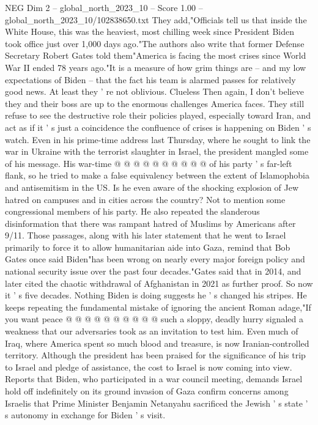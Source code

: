 \begin{textsample}{NEG Dim 2 – global\_north\_2023\_10 – Score 1.00 – global\_north\_2023\_10/102838650.txt}  \label{ex:f2_neg_295}
They add,"Officials tell us that inside the White House, this was the heaviest, most chilling week since President Biden took office just over 1,000 days ago."The authors also write that former Defense Secretary Robert Gates told them"America is facing the most crises since World War II ended 78 years ago."It is a measure of how grim things are -- and my low expectations of Biden -- that the fact his team is alarmed passes for relatively good news.
At least they ' re not oblivious.
Clueless Then again, I don't believe they and their boss are up to the enormous challenges America faces.
They still refuse to see the destructive role their policies played, especially toward Iran, and act as if it ' s just a coincidence the confluence of crises is happening on Biden ' s watch.
Even in his prime-time address last Thursday, where he sought to link the war in Ukraine with the terrorist slaughter in Israel, the president mangled some of his message.
His war-time @ @ @ @ @ @ @ @ @ @ of his party ' s far-left flank, so he tried to make a false equivalency between the extent of Islamophobia and antisemitism in the US.
Is he even aware of the shocking explosion of Jew hatred on campuses and in cities across the country?
Not to mention some congressional members of his party.
He also repeated the slanderous disinformation that there was rampant hatred of Muslims by Americans after 9/11.
Those passages, along with his later statement that he went to Israel primarily to force it to allow humanitarian aide into Gaza, remind that Bob Gates once said Biden"has been wrong on nearly every major foreign policy and national security issue over the past four decades."Gates said that in 2014, and later cited the chaotic withdrawal of Afghanistan in 2021 as further proof.
So now it ' s five decades.
Nothing Biden is doing suggests he ' s changed his stripes.
He keeps repeating the fundamental mistake of ignoring the ancient Roman adage,"If you want peace @ @ @ @ @ @ @ @ @ @ such a sloppy, deadly hurry signaled a weakness that our adversaries took as an invitation to test him.
Even much of Iraq, where America spent so much blood and treasure, is now Iranian-controlled territory.
Although the president has been praised for the significance of his trip to Israel and pledge of assistance, the cost to Israel is now coming into view.
Reports that Biden, who participated in a war council meeting, demands Israel hold off indefinitely on its ground invasion of Gaza confirm concerns among Israelis that Prime Minister Benjamin Netanyahu sacrificed the Jewish ' s state ' s autonomy in exchange for Biden ' s visit.

\end{textsample}
